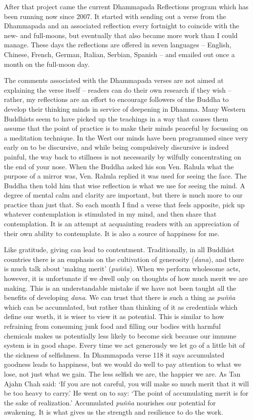 After that project came the current
Dhammapada Reflections\cite{reflections}
program which has been running now since 2007.
It started with sending out a verse from the Dhammapada and an
associated reflection every fortnight to coincide with the new- and
full-moons, but eventually that also became more work than I could
manage. These days the reflections are offered in seven languages
-- English, Chinese, French,  German, Italian, Serbian, Spanish --
and emailed out once a month on the full-moon day.

The comments associated with the Dhammapada verses are not aimed at
explaining the verse itself -- readers can do their own research if they
wish -- rather, my reflections are an effort to encourage followers of
the Buddha to develop their thinking minds in service of deepening in
Dhamma. Many Western Buddhists seem to have picked up the teachings in a
way that causes them assume that the point of practice is to make their
minds peaceful by focussing on a meditation technique. In the West our
minds have been programmed since very early on to be discursive, and
while being compulsively discursive is indeed painful, the way back to
stillness is not necessarily by wilfully concentrating on the end of
your nose. When the Buddha asked his son Ven. Rahula what the purpose of
a mirror was, Ven. Rahula replied it was used for seeing the face. The
Buddha then told him that wise reflection is what we use for seeing the
mind. A degree of mental calm and clarity are important, but there is
much more to our practice than just that. So each month I find a verse
that feels apposite, pick up whatever contemplation is stimulated in my
mind, and then share that contemplation. It is an attempt at acquainting
readers with an appreciation of their own ability to contemplate. It is
also a source of happiness for me.

Like gratitude, giving can lead to contentment. Traditionally, in all
Buddhist countries there is an emphasis on the cultivation of generosity
(\emph{dana}), and there is much talk about `making merit'
(\emph{puñña}). When we perform wholesome acts, however, it is
unfortunate if we dwell only on thoughts of how much merit we are
making. This is an understandable mistake if we have not been taught all
the benefits of developing \emph{dana}. We can trust that there is such
a thing as \emph{puñña} which can be accumulated, but rather than
thinking of it as credentials which define our worth, it is wiser to
view it as potential. This is similar to how refraining from consuming
junk food and filling our bodies with harmful chemicals makes us
potentially less likely to become sick because our immune system is in
good shape. Every time we act generously we let go of a little bit of
the sickness of selfishness. In Dhammapada verse 118 it says accumulated
goodness leads to happiness, but we would do well to pay attention to
what we lose, not just what we gain. The less selfish we are, the
happier we are. As Tan Ajahn Chah said: `If you are not careful, you
will make so much merit that it will be too heavy to carry.' He went on
to say: `The point of accumulating merit is for the sake of
realization.' Accumulated \emph{puñña} nourishes our potential for
awakening. It is what gives us the strength and resilience to do the
work.

